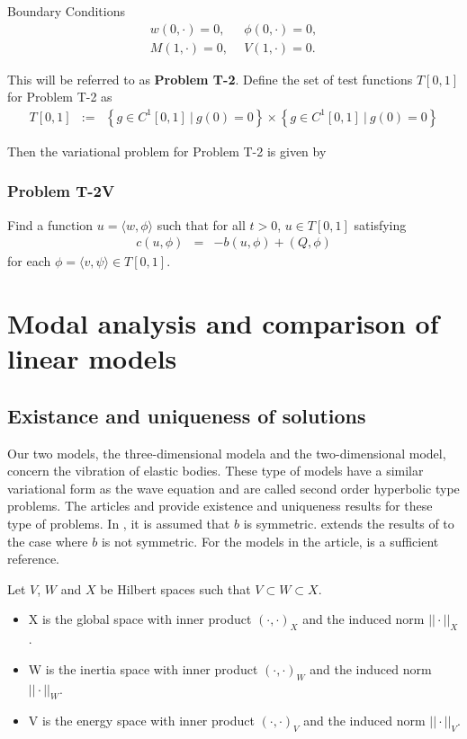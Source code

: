 				{Boundary Conditions}\\
				\begin{eqnarray*}
					w(0,\cdot) = 0, \ \ &\phi(0,\cdot) = 0, \label{eq:1D_Model:ProblemT2BC1}\\
					M(1,\cdot) = 0, \ \ &V(1,\cdot) = 0. \label{eq:1D_Model:ProblemT2BC2}
				\end{eqnarray*}

				This will be referred to as \textbf{Problem T-2}.  Define the set of test functions $T[0,1]$ for Problem T-2 as
				\begin{eqnarray*}
					T[0,1] &:=& \left\{g \in C^1[0,1] \ | \ g(0) = 0 \right\} \times \left\{g \in C^1[0,1] \ | \ g(0) = 0 \right\}
				\end{eqnarray*}

				Then the variational problem for Problem T-2 is given by
				\subsubsection*{Problem T-2V}\label{sssec:1D_Model:ProblemT1V}
					Find a function ${u} = \langle w, \phi \rangle$ such that for all $t >0$, ${u} \in  T[0,1]$ satisfying
					\begin{eqnarray}
						c(u,{\phi}) &=& -b({u},{\phi}) + (Q,{\phi}) \label{var_form_timo}
					\end{eqnarray} for each ${\phi} = \langle v, \psi \rangle \in T[0,1]$. 	
				
\section{Modal analysis and comparison of linear models}	

	\subsection*{Existance and uniqueness of solutions}
		Our two models, the three-dimensional modela and the two-dimensional model, concern the vibration of elastic bodies. These type of models have a similar variational form as the wave equation and are called second order hyperbolic type problems. The articles \cite{VV02} and \cite{VS18} provide existence and uniqueness results for these type of problems. In \cite{VV02}, it is assumed that $b$ is symmetric. \cite{VS18} extends the results of \cite{VV02} to the case where $b$ is not symmetric. For the models in the article, \cite{VV02} is a sufficient reference.

		Let $V$, $W$ and $X$ be Hilbert spaces such that $V \subset W \subset X$.
		\begin{itemize}
			\item[] X is the global space with inner product $(\cdot,\cdot)_X$ and the induced norm $||\cdot||_X$.
			\item[] W is the inertia space with inner product $(\cdot,\cdot)_W$ and the induced norm $||\cdot||_W$.
			\item[] V is the energy space with inner product $(\cdot,\cdot)_V$ and the induced norm $||\cdot||_V$.
		\end{itemize}

